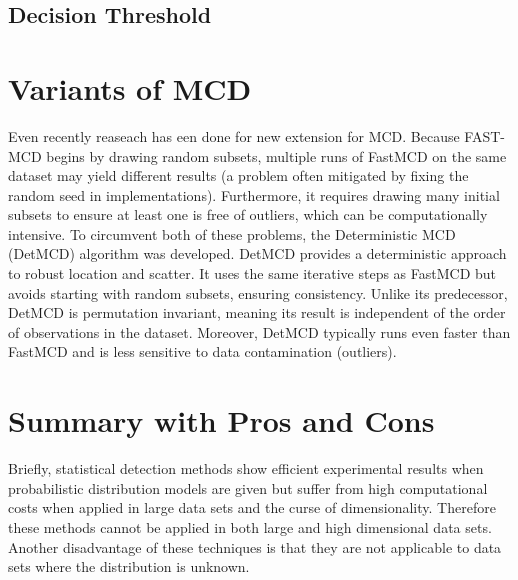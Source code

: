 \subsection*{Decision Threshold}



\section*{Variants of MCD}
Even recently reaseach has een done for new extension for MCD.
Because FAST-MCD begins by drawing random subsets, multiple runs of FastMCD on the same dataset may yield different results (a problem often mitigated by fixing the random seed in implementations). 
Furthermore, it requires drawing many initial subsets to ensure at least one is free of outliers, which can be computationally intensive. 
To circumvent both of these problems, the Deterministic MCD (DetMCD) algorithm was developed. \citep[p.621 pp.]{hubert2012deterministic}
DetMCD provides a deterministic approach to robust location and scatter. 
It uses the same iterative steps as FastMCD but avoids starting with random subsets, ensuring consistency. 
Unlike its predecessor, DetMCD is permutation invariant, meaning its result is independent of the order of observations in the dataset. 
Moreover, DetMCD typically runs even faster than FastMCD and is less sensitive to data contamination (outliers).


\section*{Summary with Pros and Cons}
Briefly, statistical detection methods show efficient experimental results when probabilistic distribution models are given but suffer from high computational costs when applied in large data sets and the curse of dimensionality. 
Therefore these methods cannot be applied in both large and high dimensional data sets.
Another disadvantage of these techniques is that they are not applicable to data sets where the distribution is unknown. \citep[p.5]{smiti2020critical}






